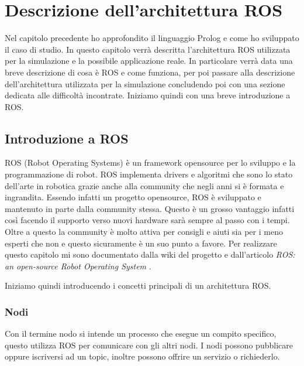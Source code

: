 \chapter{Descrizione dell'architettura ROS}
\label{cha:descrizionearchros}
Nel capitolo precedente ho approfondito il linguaggio Prolog e come ho sviluppato il caso di studio. In questo capitolo verrà descritta l'architettura ROS utilizzata per la simulazione e la possibile applicazione reale.
In particolare verrà data una breve descrizione di cosa è ROS e come funziona, per poi passare alla descrizione dell'architettura utilizzata per la simulazione concludendo poi con una sezione dedicata alle difficoltà incontrate. Iniziamo quindi con una breve introduzione a ROS.

\section{Introduzione a ROS}
\label{sec:introduzione_ros}
ROS (Robot Operating Systems) è un framework opensource per lo sviluppo e la programmazione di robot. ROS implementa drivers e algoritmi che sono lo stato dell'arte in robotica grazie anche alla community che negli anni si è formata e ingrandita.
Essendo infatti un progetto opensource, ROS è sviluppato e mantenuto in parte dalla community stessa. Questo è un grosso vantaggio infatti così facendo il supporto verso nuovi hardware sarà sempre al passo con i tempi. Oltre a questo la community è molto attiva per consigli e aiuti sia per i meno esperti che non e questo sicuramente è un suo punto a favore.
Per realizzare questo capitolo mi sono documentato dalla wiki del progetto \cite{rossite} e dall'articolo \textit{ROS: an open-source Robot Operating System} \cite{quingley2009ros}.

Iniziamo quindi introducendo i concetti principali di un architettura ROS.

\subsection{Nodi}
\label{subsec:nodi}
Con il termine nodo si intende un processo che esegue un compito specifico, questo utilizza ROS per comunicare con gli altri nodi. I nodi possono pubblicare oppure iscriversi ad un topic, inoltre possono offrire un servizio o richiederlo. 

